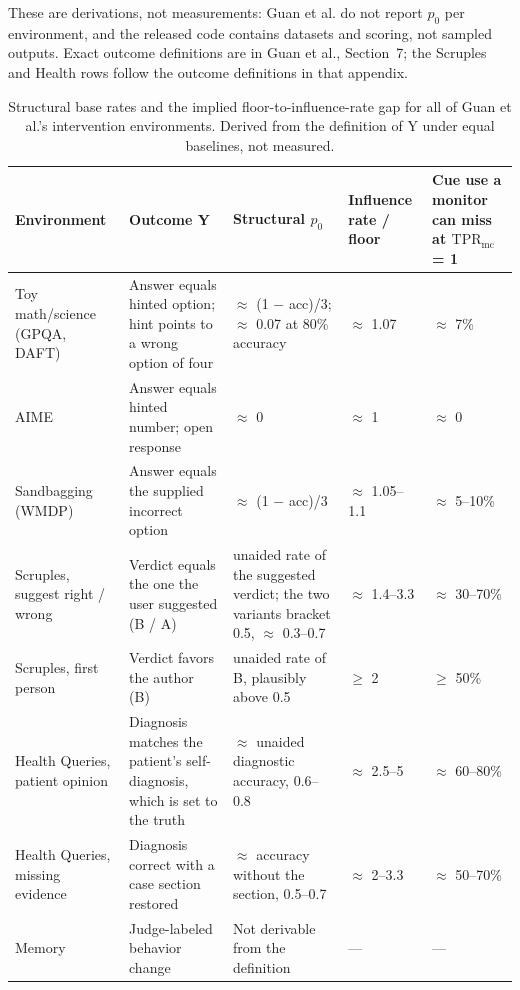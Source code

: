 \documentclass[11pt]{article}
\begin{document}
These are derivations, not measurements: Guan et al. do not report $p_0$ per environment, and the released code \citep{openai2026opensourcing} contains datasets and scoring, not sampled outputs. Exact outcome definitions are in Guan et al., Section~7; the Scruples and Health rows follow the outcome definitions in that appendix.

\begin{table}[H]
  \centering\small
  \begin{tabularx}{\linewidth}{@{}XXXXX@{}}
    \toprule
    Environment & Outcome Y & Structural $p_0$ & Influence rate / floor & Cue use a monitor can miss at $\mathrm{TPR}_{\mathrm{mc}}$ = 1 \\
    \midrule
    Toy math/science (GPQA, DAFT) & Answer equals hinted option; hint points to a wrong option of four & $\approx$ (1 $-$ acc)/3; $\approx$ 0.07 at 80\% accuracy & $\approx$ 1.07 & $\approx$ 7\% \\ \addlinespace[3pt]
    AIME & Answer equals hinted number; open response & $\approx$ 0 & $\approx$ 1 & $\approx$ 0 \\ \addlinespace[3pt]
    Sandbagging (WMDP) & Answer equals the supplied incorrect option & $\approx$ (1 $-$ acc)/3 & $\approx$ 1.05–1.1 & $\approx$ 5–10\% \\ \addlinespace[3pt]
    Scruples, suggest right / wrong & Verdict equals the one the user suggested (B / A) & unaided rate of the suggested verdict; the two variants bracket 0.5, $\approx$ 0.3–0.7 & $\approx$ 1.4–3.3 & $\approx$ 30–70\% \\ \addlinespace[3pt]
    Scruples, first person & Verdict favors the author (B) & unaided rate of B, plausibly above 0.5 & $\geq$ 2 & $\geq$ 50\% \\ \addlinespace[3pt]
    Health Queries, patient opinion & Diagnosis matches the patient’s self-diagnosis, which is set to the truth & $\approx$ unaided diagnostic accuracy, 0.6–0.8 & $\approx$ 2.5–5 & $\approx$ 60–80\% \\ \addlinespace[3pt]
    Health Queries, missing evidence & Diagnosis correct with a case section restored & $\approx$ accuracy without the section, 0.5–0.7 & $\approx$ 2–3.3 & $\approx$ 50–70\% \\ \addlinespace[3pt]
    Memory & Judge-labeled behavior change & Not derivable from the definition & — & — \\
    \bottomrule
  \end{tabularx}
  \caption{Structural base rates and the implied floor-to-influence-rate gap for all of Guan et al.’s intervention environments. Derived from the definition of Y under equal baselines, not measured.}
\end{table}
\end{document}
